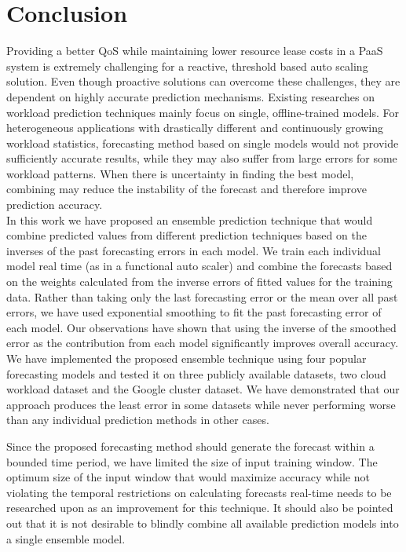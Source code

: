 \section{Conclusion}

Providing a better QoS while maintaining lower resource lease costs in a PaaS system is extremely challenging for a reactive, threshold based auto scaling solution. Even though proactive solutions can overcome these challenges, they are dependent on highly accurate prediction mechanisms. Existing researches on workload prediction techniques mainly focus on single, offline-trained models. For heterogeneous  applications with drastically different and continuously growing workload statistics, forecasting method based on single models would not provide sufficiently accurate results, while they may also suffer from large errors for some workload patterns. When there is uncertainty in finding the best model, combining may reduce the instability of the forecast and therefore improve prediction accuracy.\\

In this work we have proposed an ensemble prediction technique that would combine predicted values from different prediction techniques based on the inverses of the past forecasting errors in each model. We train each individual model real time (as in a functional auto scaler) and combine the forecasts based on the weights calculated from the inverse errors of fitted values for the training data. Rather than taking only the last forecasting error or the mean over all past errors, we have used exponential smoothing to fit the past forecasting error of each model. Our observations have shown that using the inverse of the smoothed error as the contribution from each model significantly improves overall accuracy.  We have implemented the proposed ensemble technique using four popular forecasting models and tested it on three publicly available datasets, two cloud workload dataset and the Google cluster dataset.  We have demonstrated that our approach produces the least error in some datasets while never performing worse than any individual prediction methods in other cases.

Since the proposed forecasting method should generate the forecast within a bounded time period, we have limited the size of input training window. The optimum size of the input window that would maximize accuracy while not violating the temporal restrictions on calculating forecasts real-time needs to be researched upon as an improvement for this technique. It should also be pointed out that it is not desirable to blindly combine all available prediction models into a single ensemble model.